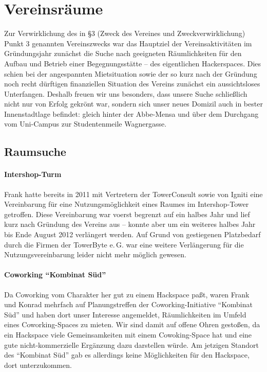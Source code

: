 \documentclass[10pt,DIV16]{scrartcl}
\begin{document}
\section{Vereinsräume}

Zur Verwirklichung des in §3 (Zweck des Vereines und Zweckverwirklichung)
Punkt 3 genannten Vereinszwecks war das Hauptziel der Vereinsaktivitäten im
Gründungsjahr zunächst die Suche nach geeigneten Räumlichkeiten für den Aufbau
und Betrieb einer Begegnungsstätte -- des eigentlichen Hackerspaces.  Dies
schien bei der angespannten Mietsituation sowie der so kurz nach der Gründung
noch recht dürftigen finanziellen Situation des Vereins zunächst ein
aussichtsloses Unterfangen.  Deshalb freuen wir uns besonders, dass unsere
Suche schließlich nicht nur von Erfolg gekrönt war, sondern sich unser neues
Domizil auch in bester Innenstadtlage befindet:  gleich hinter der Abbe-Mensa
und über dem Durchgang vom Uni-Campus zur Studentenmeile Wagnergasse.

\subsection{Raumsuche}

\paragraph{Intershop-Turm}

Frank hatte bereits in 2011 mit Vertretern der TowerConsult sowie 
von Igniti eine Vereinbarung für eine Nutzungsmöglichkeit eines 
Raumes im Intershop-Tower getroffen. Diese Vereinbarung war voerst 
begrenzt auf ein halbes Jahr und lief kurz nach Gründung des Vereins 
aus -- konnte aber um ein weiteres halbes Jahr bis Ende August 2012 
verlängert werden. Auf Grund von gestiegenen Platzbedarf durch die 
Firmen der TowerByte e.\,G. war eine weitere Verlängerung für die 
Nutzungsvereinbarung leider nicht mehr möglich gewesen. 

\paragraph{Coworking ``Kombinat Süd''}

Da Coworking vom Charakter her gut zu einem Hackspace paßt, waren Frank und
Konrad mehrfach auf Planungstreffen der Coworking-Initiative "`Kombinat Süd"'
und haben dort unser Interesse angemeldet, Räumlichkeiten im Umfeld eines
Coworking-Spaces zu mieten.  Wir sind damit auf offene Ohren gestoßen, da ein
Hackspace viele Gemeinsamkeiten mit einem Cowoking-Space hat und eine gute
nicht-kommerzielle Ergänzung dazu darstellen würde.  Am jetzigen Standort des
"`Kombinat Süd"' gab es allerdings keine Möglichkeiten für den Hackspace, dort
unterzukommen.
\end{document}
